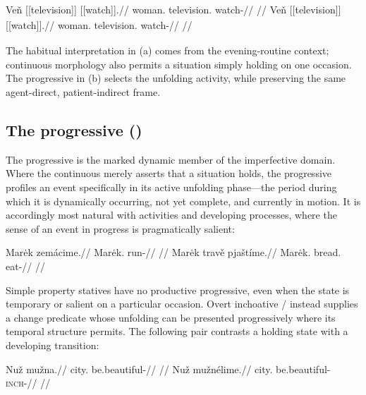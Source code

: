 \pex\label{ex:vm-slot-habit-scene}
\a
\begingl
\gla Veň \textnormal{[[television]]}\textsubscript{\Ind{}} \textnormal{[[watch]]}\textsubscript{\Cont{}}.//
\glb woman.\Dir{} television.\Ind{} watch-\Cont{}//
\glft {}
//
\endgl
\a
\begingl
\gla Veň \textnormal{[[television]]}\textsubscript{\Ind{}} \textnormal{[[watch]]}\textsubscript{\Prog{}}.//
\glb woman.\Dir{} television.\Ind{} watch-\Prog{}//
\glft {}
//
\endgl
\xe

The habitual interpretation in (a) comes from the evening-routine context;
continuous morphology also permits a situation simply holding on one occasion.
The progressive in (b) selects the unfolding activity, while preserving the
same agent-direct, patient-indirect frame.

\subsection{The progressive ()}
The progressive is the marked dynamic member of the imperfective domain.
Where the continuous merely asserts that a situation holds, the progressive
profiles an event specifically in its active unfolding phase---the period during
which it is dynamically occurring, not yet complete, and currently in motion.
It is accordingly most natural with activities and developing processes, where
the sense of an event in progress is pragmatically salient:

\pex
\a
\begingl
\gla Marėk zemácime.//
\glb Marėk.\Dir{} run-\Prog{}//
\glft {} //
\endgl
\a
\begingl
\gla Marėk travě pjaštíme.//
\glb Marėk.\Dir{} bread.\Ind{} eat-\Prog{}//
\glft {} //
\endgl
\xe

Simple property statives have no productive progressive, even when the
state is temporary or salient on a particular occasion. Overt inchoative
/ instead supplies a change predicate whose unfolding
can be presented progressively where its temporal structure permits.
The following pair contrasts a holding state with a developing transition:

\pex
\a
\begingl
\gla Nuž mužna.//
\glb city.\Dir{} be.beautiful-\Cont{}//
\glft {} //
\endgl
\a
\begingl
\gla Nuž mužnélime.//
\glb city.\Dir{} be.beautiful-\textsc{inch}-\Prog{}//
\glft {} //
\endgl
\xe

